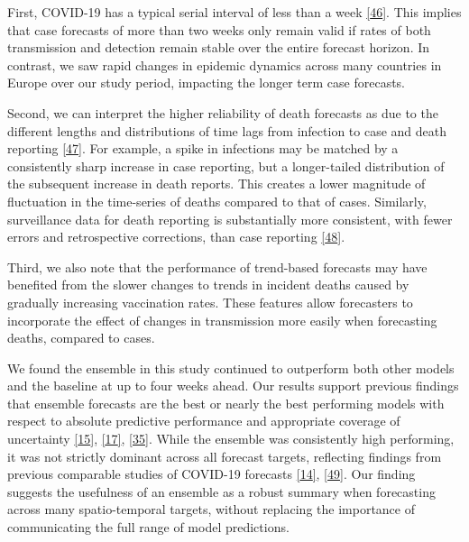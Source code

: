 \documentclass[
]{article}
\begin{document}
First, COVID-19 has a typical serial interval of less than a week \protect\hyperlink{ref-aleneSerialIntervalIncubation2021}{{[}46{]}}. This implies that case forecasts of more than two weeks only remain valid if rates of both transmission and detection remain stable over the entire forecast horizon. In contrast, we saw rapid changes in epidemic dynamics across many countries in Europe over our study period, impacting the longer term case forecasts.

Second, we can interpret the higher reliability of death forecasts as due to the different lengths and distributions of time lags from infection to case and death reporting \protect\hyperlink{ref-jinLagDailyReported2021}{{[}47{]}}. For example, a spike in infections may be matched by a consistently sharp increase in case reporting, but a longer-tailed distribution of the subsequent increase in death reports. This creates a lower magnitude of fluctuation in the time-series of deaths compared to that of cases. Similarly, surveillance data for death reporting is substantially more consistent, with fewer errors and retrospective corrections, than case reporting \protect\hyperlink{ref-catalaRobustEstimationDiagnostic2021}{{[}48{]}}.

Third, we also note that the performance of trend-based forecasts may have benefited from the slower changes to trends in incident deaths caused by gradually increasing vaccination rates. These features allow forecasters to incorporate the effect of changes in transmission more easily when forecasting deaths, compared to cases.

We found the ensemble in this study continued to outperform both other models and the baseline at up to four weeks ahead. Our results support previous findings that ensemble forecasts are the best or nearly the best performing models with respect to absolute predictive performance and appropriate coverage of uncertainty \protect\hyperlink{ref-funkShorttermForecastsInform2020}{{[}15{]}}, \protect\hyperlink{ref-viboudRAPIDDEbolaForecasting2018}{{[}17{]}}, \protect\hyperlink{ref-cramerEvaluationIndividualEnsemble2021}{{[}35{]}}. While the ensemble was consistently high performing, it was not strictly dominant across all forecast targets, reflecting findings from previous comparable studies of COVID-19 forecasts \protect\hyperlink{ref-bracherPreregisteredShorttermForecasting2021}{{[}14{]}}, \protect\hyperlink{ref-brooksComparingEnsembleApproaches2020}{{[}49{]}}. Our finding suggests the usefulness of an ensemble as a robust summary when forecasting across many spatio-temporal targets, without replacing the importance of communicating the full range of model predictions.
\end{document}
